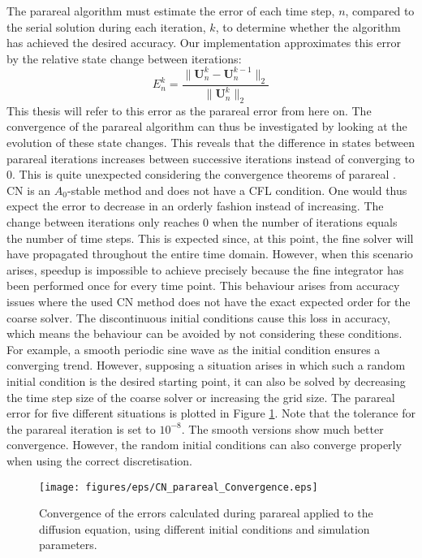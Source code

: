 The parareal algorithm must estimate the error of each time step, $n$, compared to the serial solution during each iteration, $k$, to determine whether the algorithm has achieved the desired accuracy. Our implementation approximates this error by the relative state change between iterations:\[
E^k_n = \frac{\|\textbf{U}^k_n - \textbf{U}^{k-1}_n\|_2}{\|\textbf{U}^k_n\|_2}
\]This thesis will refer to this error as the parareal error from here on. The convergence of the parareal algorithm can thus be investigated by looking at the evolution of these state changes. This reveals that the difference in states between parareal iterations increases between successive iterations instead of converging to 0. This is quite unexpected considering the convergence theorems of parareal \cite{gander_analysis_2007}. CN is an $A_0$-stable method and does not have a CFL condition. One would thus expect the error to decrease in an orderly fashion instead of increasing. 
The change between iterations only reaches 0 when the number of iterations equals the number of time steps. This is expected since, at this point, the fine solver will have propagated throughout the entire time domain. However, when this scenario arises, speedup is impossible to achieve precisely because the fine integrator has been performed once for every time point. 
This behaviour arises from accuracy issues where the used CN method does not have the exact expected order for the coarse solver. The discontinuous initial conditions cause this loss in accuracy, which means the behaviour can be avoided by not considering these conditions. For example, a smooth periodic sine wave as the initial condition ensures a converging trend. However, supposing a situation arises in which such a random initial condition is the desired starting point, it can also be solved by decreasing the time step size of the coarse solver or increasing the grid size. The parareal error for five different situations is plotted in Figure \ref{fig: CN-parareal-convergence}. Note that the tolerance for the parareal iteration is set to $10^{-8}$. The smooth versions show much better convergence. However, the random initial conditions can also converge properly when using the correct discretisation. 
\begin{figure}[h]
    \centering
    \texttt{[image: figures/eps/CN\_parareal\_Convergence.eps]}
    \caption{Convergence of the errors calculated during parareal applied to the diffusion equation, using different initial conditions and simulation parameters.}
    \label{fig: CN-parareal-convergence}
\end{figure}

